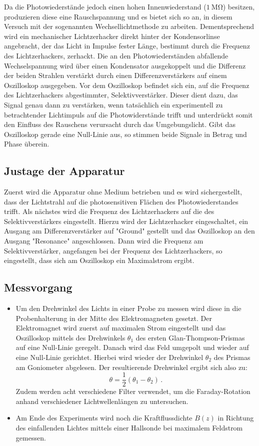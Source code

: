 Da die Photowiederstände jedoch
einen hohen Innenwiederstand ($\SI{1}{\mega\ohm}$) besitzen, produzieren diese eine
Rauschspannung und es bietet sich so an, in diesem Versuch mit der sogenannten
Wechsellichtmethode zu arbeiten. Dementsprechend wird ein mechanischer Lichtzerhacker direkt hinter der
Kondensorlinse angebracht, der das Licht in Impulse fester Länge, bestimmt durch die Frequenz des Lichtzerhackers, zerhackt. Die an den Photowiederständen
abfallende Wechselspannung wird über einen Kondensator ausgekoppelt und die Differenz der
beiden Strahlen verstärkt durch einen Differenzverstärkers auf einem Oszilloskop
ausgegeben. Vor dem Oszilloskop befindet sich ein, auf die Frequenz des Lichtzerhackers abgestimmter,
Selektivverstärker. Dieser dient dazu, das Signal genau dann zu verstärken, wenn tatsächlich ein experimentell zu betrachtender Lichtimpuls auf die Photowiderstände trifft und unterdrückt somit den Einfluss des Rauschens verursacht durch das Umgebungslicht.
Gibt das Oszilloskop gerade eine Null-Linie aus, so stimmen beide Signale in Betrag und Phase überein.
\subsection{Justage der Apparatur}
Zuerst wird die Apparatur ohne Medium betrieben und es wird sichergestellt, dass der Lichtstrahl
auf die photosensitiven Flächen des Photowiederstandes trifft. Als nächstes wird die Frequenz
des Lichtzerhackers auf die des Selektivverstärkers eingestellt. Hierzu wird der Lichtzerhacker
eingeschaltet, ein Ausgang am Differenzverstärker auf "Ground" gestellt und das Oszilloskop an den
Ausgang "Resonance" angeschlossen. Dann wird die Frequenz am Selektivverstärker, angefangen
bei der Frequenz des Lichtzerhackers, so eingestellt, dass sich am Oszilloskop ein Maximalstrom
ergibt.
\subsection{Messvorgang}
\begin{itemize}
	\item Um den Drehwinkel des Lichts in einer Probe zu messen wird diese in die Probenhalterung in der Mitte des Elektromagneten gesetzt.
	Der Elektromagnet  wird zuerst auf maximalen Strom eingestellt und das Oszilloskop mittels des Drehwinkels $\theta_1$
		des ersten Glan-Thompson-Prismas auf eine Null-Linie geregelt. Danach wird das
		Feld umgepolt und wieder auf eine Null-Linie gerichtet. Hierbei wird wieder der
		Drehwinkel $\theta_2$ des Prismas am Goniometer abgelesen. Der resultierende
		Drehwinkel ergibt sich also zu:
		\begin{equation*}
			\theta = \frac{1}{2}(\theta_1-\theta_2) \, \mathrm{.}
		\end{equation*}
		Zudem werden acht verschiedene Filter verwendet, um die Faraday-Rotation anhand verschiedener Lichtwellenlängen zu untersuchen.
	\item Am Ende des Experiments wird noch die Kraftflussdichte $B(z)$ in Richtung des
		einfallenden Lichtes mittels einer Hallsonde bei maximalem Feldstrom gemessen.
\end{itemize}
